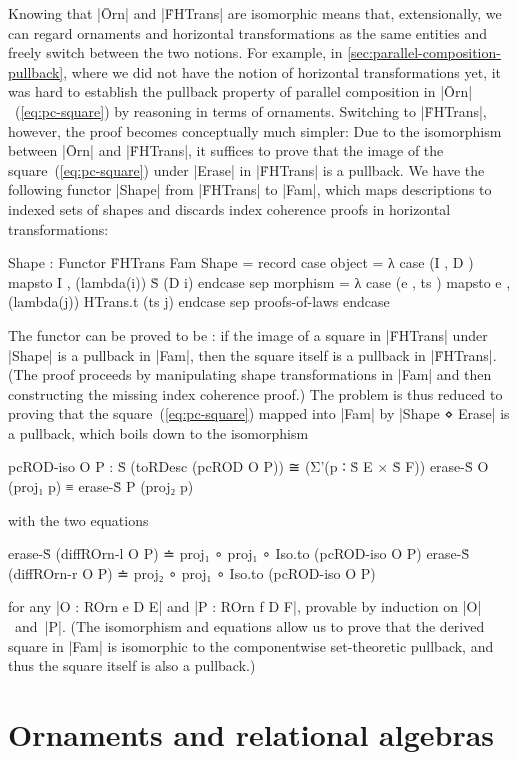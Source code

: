 Knowing that |Ōrn| and |ḞHTrans| are isomorphic means that, extensionally, we can regard ornaments and horizontal transformations as the same entities and freely switch between the two notions.
For example, in \autoref{sec:parallel-composition-pullback}, where we did not have the notion of horizontal transformations yet, it was hard to establish the pullback property of parallel composition in |Ōrn|~(\ref{eq:pc-square}) by reasoning in terms of ornaments.
Switching to |ḞHTrans|, however, the proof becomes conceptually much simpler:
Due to the isomorphism between |Ōrn| and |ḞHTrans|, it suffices to prove that the image of the square~(\ref{eq:pc-square}) under |Erase| in |ḞHTrans| is a pullback.
We have the following functor |Shape| from |ḞHTrans| to |Fam|, which maps descriptions to indexed sets of shapes and discards index coherence proofs in horizontal transformations:
\begin{code}
Shape : Functor ḞHTrans Fam
Shape = record
  case  object    = λ case (I , D   ) mapsto I  , (lambda(i)) Ṡ (D i)            endcase
  sep   morphism  = λ case (e , ts  ) mapsto e  , (lambda({j})) HTrans.t (ts j)  endcase
  sep   proofs-of-laws endcase
\end{code}
The functor can be proved to be : if the image of a square in |ḞHTrans| under |Shape| is a pullback in |Fam|, then the square itself is a pullback in |ḞHTrans|.
(The proof proceeds by manipulating shape transformations in |Fam| and then constructing the missing index coherence proof.)
The problem is thus reduced to proving that the square~(\ref{eq:pc-square}) mapped into |Fam| by |Shape ⋄ Erase| is a pullback, which boils down to the isomorphism
\begin{code}
pcROD-iso O P :  Ṡ (toRDesc (pcROD O P))
                   ≅ (Σ'(p ∶ Ṡ E × Ṡ F)) erase-Ṡ O (proj₁ p) ≡ erase-Ṡ P (proj₂ p)
\end{code}
with the two equations
\begin{code}
erase-Ṡ (diffROrn-l  O P) ≐ proj₁  ∘ proj₁ ∘ Iso.to (pcROD-iso O P)
erase-Ṡ (diffROrn-r  O P) ≐ proj₂  ∘ proj₁ ∘ Iso.to (pcROD-iso O P)
\end{code}
for any |O : ROrn e D E| and |P : ROrn f D F|, provable by induction on |O|~and~|P|.
(The isomorphism and equations allow us to prove that the derived square in |Fam| is isomorphic to the componentwise set-theoretic pullback, and thus the square itself is also a pullback.)

\section{Ornaments and relational algebras}
\label{sec:ornaments-and-relational-algebras}

